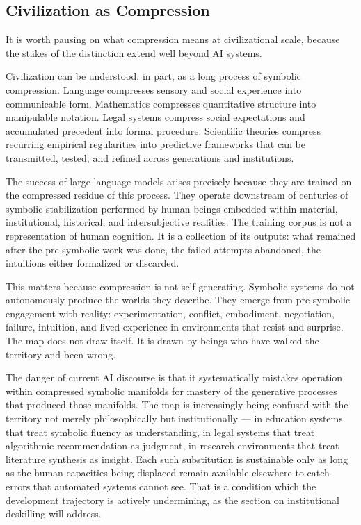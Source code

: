 \documentclass[12pt, a4paper]{article}
\theoremstyle{remark}
\begin{document}
\subsection{Civilization as Compression}

It is worth pausing on what compression means at civilizational scale, because the stakes of the distinction extend well beyond AI systems.

Civilization can be understood, in part, as a long process of symbolic compression. Language compresses sensory and social experience into communicable form. Mathematics compresses quantitative structure into manipulable notation. Legal systems compress social expectations and accumulated precedent into formal procedure. Scientific theories compress recurring empirical regularities into predictive frameworks that can be transmitted, tested, and refined across generations and institutions.

The success of large language models arises precisely because they are trained on the compressed residue of this process. They operate downstream of centuries of symbolic stabilization performed by human beings embedded within material, institutional, historical, and intersubjective realities. The training corpus is not a representation of human cognition. It is a collection of its outputs: what remained after the pre-symbolic work was done, the failed attempts abandoned, the intuitions either formalized or discarded.

This matters because compression is not self-generating. Symbolic systems do not autonomously produce the worlds they describe. They emerge from pre-symbolic engagement with reality: experimentation, conflict, embodiment, negotiation, failure, intuition, and lived experience in environments that resist and surprise. The map does not draw itself. It is drawn by beings who have walked the territory and been wrong.

The danger of current AI discourse is that it systematically mistakes operation within compressed symbolic manifolds for mastery of the generative processes that produced those manifolds. The map is increasingly being confused with the territory not merely philosophically but institutionally --- in education systems that treat symbolic fluency as understanding, in legal systems that treat algorithmic recommendation as judgment, in research environments that treat literature synthesis as insight. Each such substitution is sustainable only as long as the human capacities being displaced remain available elsewhere to catch errors that automated systems cannot see. That is a condition which the development trajectory is actively undermining, as the section on institutional deskilling will address.
\end{document}
